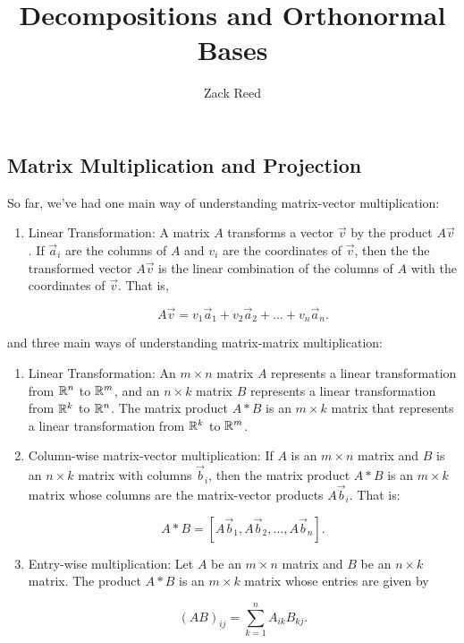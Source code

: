 \documentclass{ximera}
\author{Zack Reed}
\title{Decompositions and Orthonormal Bases}
\begin{document}
\begin{abstract}


\end{abstract}
\maketitle

\subsection*{Matrix Multiplication and Projection}

So far, we've had one main way of understanding matrix-vector multiplication:

\begin{enumerate}
   \item Linear Transformation: A matrix $A$ transforms a vector $\vec{v}$ by the product $A\vec{v}$. If $\vec{a}_i$ are the columns of $A$ and $v_i$ are the coordinates of $\vec{v}$, then the the transformed vector $A\vec{v}$ is the linear combination of the columns of $A$ with the coordinates of $\vec{v}$. That is, 
   
   $$A\vec{v}=v_1\vec{a}_1+v_2\vec{a}_2+\ldots+v_n\vec{a}_n.$$
\end{enumerate}

and three main ways of understanding matrix-matrix multiplication:

\begin{enumerate}
   \item Linear Transformation: An $m\times n$ matrix $A$ represents a linear transformation from $\mathbb{R}^n$ to $\mathbb{R}^m$, and an $n\times k$ matrix $B$ represents a linear transformation from $\mathbb{R}^k$ to $\mathbb{R}^n$. The matrix product $A*B$ is an $m\times k$ matrix that represents a linear transformation from $\mathbb{R}^k$ to $\mathbb{R}^m$.
   \item Column-wise matrix-vector multiplication: If $A$ is an $m\times n$ matrix and $B$ is an $n\times k$ matrix with columns $\vec{b}_i$, then the matrix product $A*B$ is an $m\times k$ matrix whose columns are the matrix-vector products $A\vec{b}_i$. That is:
   
   $$A*B=\left[A\vec{b}_1, A\vec{b}_2, \ldots, A\vec{b}_n\right].$$
   \item Entry-wise multiplication: Let $A$ be an $m\times n$ matrix and $B$ be an $n\times k$ matrix. The product $A*B$ is an $m\times k$ matrix whose entries are given by
 
   $$(AB)_{ij}=\sum_{k=1}^n A_{ik}B_{kj}.$$
\end{enumerate}
\end{document}

